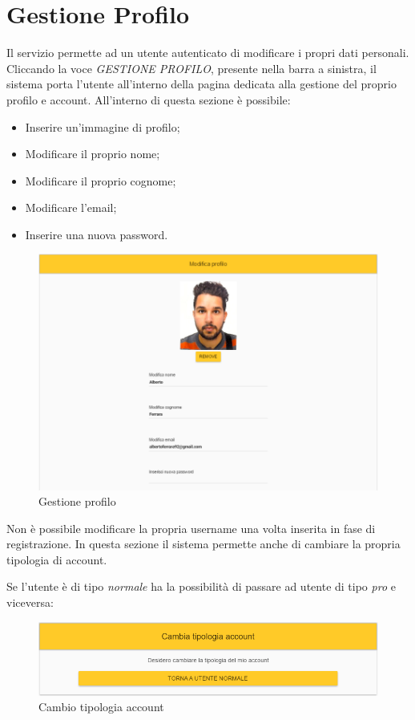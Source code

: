 \newpage
\section{Gestione Profilo}
Il servizio permette ad un utente autenticato di modificare i propri dati personali. Cliccando la voce \textit{GESTIONE PROFILO}, presente nella barra a sinistra, il sistema porta l'utente all'interno della pagina dedicata alla gestione del proprio profilo e account. All'interno di questa sezione è possibile:
\begin{itemize}
	\item Inserire un'immagine di profilo;
	\item Modificare il proprio nome;
	\item Modificare il proprio cognome;
	\item Modificare l'email;
	\item Inserire una nuova password.
\end{itemize}

\label{GestioneProfilo}
\begin{figure}[ht]
	\centering
	\includegraphics[scale=0.45]{img/gestione_profilo.png}
	\caption{Gestione profilo}
\end{figure}
\FloatBarrier

Non è possibile modificare la propria username una volta inserita in fase di registrazione.
In questa sezione il sistema permette anche di cambiare la propria tipologia di account. 

\newpage
Se l'utente è di tipo \textit{normale} ha la possibilità di passare ad utente di tipo \textit{pro} e viceversa:

\label{CambioTipologiaAccount}
\begin{figure}[ht]
	\centering
	\includegraphics[scale=0.45]{img/cambia_tipologia.png}
	\caption{Cambio tipologia account}
\end{figure}
\FloatBarrier

